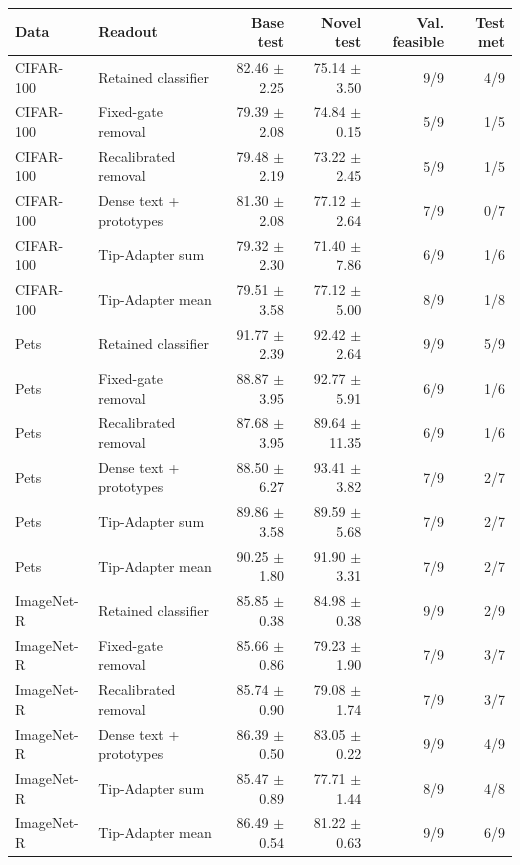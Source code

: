 \begin{tabular}{llrrrr}
\toprule
Data & Readout & Base test & Novel test & Val. feasible & Test met \\
\midrule
CIFAR-100 & Retained classifier & 82.46 $\pm$ 2.25 & 75.14 $\pm$ 3.50 & 9/9 & 4/9 \\
CIFAR-100 & Fixed-gate removal & 79.39 $\pm$ 2.08 & 74.84 $\pm$ 0.15 & 5/9 & 1/5 \\
CIFAR-100 & Recalibrated removal & 79.48 $\pm$ 2.19 & 73.22 $\pm$ 2.45 & 5/9 & 1/5 \\
CIFAR-100 & Dense text + prototypes & 81.30 $\pm$ 2.08 & 77.12 $\pm$ 2.64 & 7/9 & 0/7 \\
CIFAR-100 & Tip-Adapter sum & 79.32 $\pm$ 2.30 & 71.40 $\pm$ 7.86 & 6/9 & 1/6 \\
CIFAR-100 & Tip-Adapter mean & 79.51 $\pm$ 3.58 & 77.12 $\pm$ 5.00 & 8/9 & 1/8 \\
\midrule
Pets & Retained classifier & 91.77 $\pm$ 2.39 & 92.42 $\pm$ 2.64 & 9/9 & 5/9 \\
Pets & Fixed-gate removal & 88.87 $\pm$ 3.95 & 92.77 $\pm$ 5.91 & 6/9 & 1/6 \\
Pets & Recalibrated removal & 87.68 $\pm$ 3.95 & 89.64 $\pm$ 11.35 & 6/9 & 1/6 \\
Pets & Dense text + prototypes & 88.50 $\pm$ 6.27 & 93.41 $\pm$ 3.82 & 7/9 & 2/7 \\
Pets & Tip-Adapter sum & 89.86 $\pm$ 3.58 & 89.59 $\pm$ 5.68 & 7/9 & 2/7 \\
Pets & Tip-Adapter mean & 90.25 $\pm$ 1.80 & 91.90 $\pm$ 3.31 & 7/9 & 2/7 \\
\midrule
ImageNet-R & Retained classifier & 85.85 $\pm$ 0.38 & 84.98 $\pm$ 0.38 & 9/9 & 2/9 \\
ImageNet-R & Fixed-gate removal & 85.66 $\pm$ 0.86 & 79.23 $\pm$ 1.90 & 7/9 & 3/7 \\
ImageNet-R & Recalibrated removal & 85.74 $\pm$ 0.90 & 79.08 $\pm$ 1.74 & 7/9 & 3/7 \\
ImageNet-R & Dense text + prototypes & 86.39 $\pm$ 0.50 & 83.05 $\pm$ 0.22 & 9/9 & 4/9 \\
ImageNet-R & Tip-Adapter sum & 85.47 $\pm$ 0.89 & 77.71 $\pm$ 1.44 & 8/9 & 4/8 \\
ImageNet-R & Tip-Adapter mean & 86.49 $\pm$ 0.54 & 81.22 $\pm$ 0.63 & 9/9 & 6/9 \\
\bottomrule
\end{tabular}
